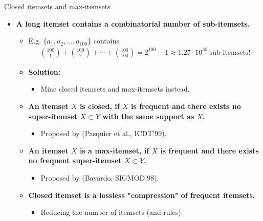 \documentclass[aspectratio=169,t,xcolor=dvipsnames]{beamer}
\begin{document}
  {
    \begin{frame}{Closed itemsets and max-itemsets}
    \begin{itemize}
      \item \textbf{A long itemset contains a combinatorial number of sub-itemsets.}
      \begin{itemize}
        \item E.g. $\{a_1,a_2,\ldots,a_{100}\}$ contains
        \begin{align}
        {100\choose 1} + {100 \choose 2} + \cdots + {100 \choose 100} = 2^{100}-1 \approx 1.27 \cdot 10^{30} \; \text{sub-itemsets!}
        \end{align}
        \item \textbf{Solution:}
        \begin{itemize}
          \item Mine closed itemsets and max-itemsets instead.
        \end{itemize}
        \item \textbf{An itemset $X$ is closed, if $X$ is frequent and there exists no super-itemset $X \subset Y$ with the same support as $X$.}
        \begin{itemize}
          \item Proposed by (Pasquier et al., ICDT'99).
        \end{itemize}
        \item \textbf{An itemset $X$ is a max-itemset, if $X$ is frequent and there exists no frequent super-itemset $X \subset Y$.}
        \begin{itemize}
          \item Proposed by (Bayardo, SIGMOD'98).
        \end{itemize}
        \item \textbf{Closed itemset is a lossless "compression" of frequent itemsets.}
        \begin{itemize}
          \item Reducing the number of itemsets (and rules).
        \end{itemize}
      \end{itemize}
    \end{itemize}
    \end{frame}
  }
\end{document}
